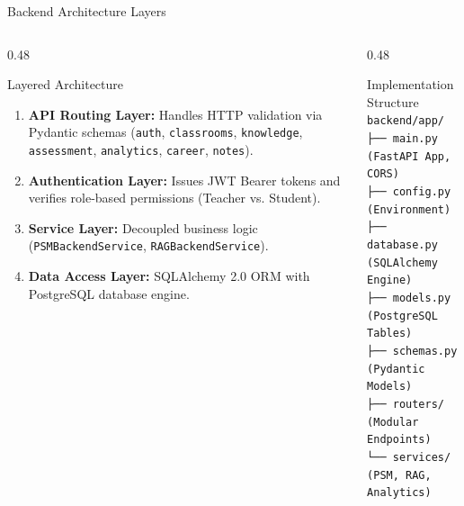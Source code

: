 \documentclass[aspectratio=169,10pt]{beamer}
\begin{document}
\begin{frame}{Backend Architecture Layers}
  \begin{columns}[T]
    \begin{column}{0.48\textwidth}
      \begin{block}{Layered Architecture}
        \begin{enumerate}
          \item \textbf{API Routing Layer:} Handles HTTP validation via Pydantic schemas (\texttt{auth}, \texttt{classrooms}, \texttt{knowledge}, \texttt{assessment}, \texttt{analytics}, \texttt{career}, \texttt{notes}).
          \item \textbf{Authentication Layer:} Issues JWT Bearer tokens and verifies role-based permissions (Teacher vs. Student).
          \item \textbf{Service Layer:} Decoupled business logic (\texttt{PSMBackendService}, \texttt{RAGBackendService}).
          \item \textbf{Data Access Layer:} SQLAlchemy 2.0 ORM with PostgreSQL database engine.
        \end{enumerate}
      \end{block}
    \end{column}
    \begin{column}{0.48\textwidth}
      \begin{block}{Implementation Structure}
        \footnotesize
        \texttt{backend/app/}\\
        \texttt{\phantom{X}├── main.py \quad (FastAPI App, CORS)}\\
        \texttt{\phantom{X}├── config.py \quad (Environment)}\\
        \texttt{\phantom{X}├── database.py \quad (SQLAlchemy Engine)}\\
        \texttt{\phantom{X}├── models.py \quad (PostgreSQL Tables)}\\
        \texttt{\phantom{X}├── schemas.py \quad (Pydantic Models)}\\
        \texttt{\phantom{X}├── routers/ \quad (Modular Endpoints)}\\
        \texttt{\phantom{X}└── services/ \quad (PSM, RAG, Analytics)}
      \end{block}
    \end{column}
  \end{columns}
\end{frame}
\end{document}
